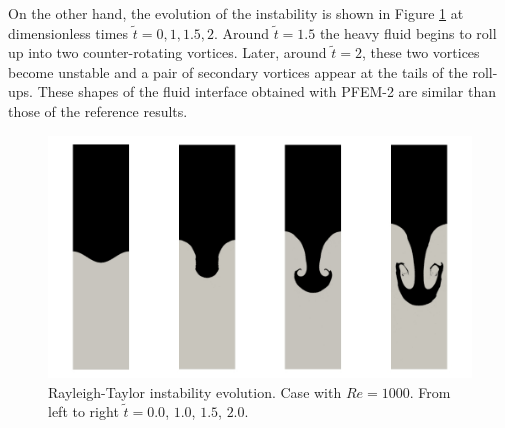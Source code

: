 On the other hand, the evolution of the instability is shown in Figure \ref{fg:rayleigh-screenshots} at dimensionless times $\widetilde{t}=0, 1, 1.5, 2$. Around $\widetilde{t}=1.5$ the heavy fluid begins to roll up into two counter-rotating vortices. Later, around $\widetilde{t} = 2$, these two vortices become unstable and a pair of secondary vortices appear at the tails of the roll-ups. These shapes of the fluid interface obtained with PFEM-2 are similar than those of the reference results.


\begin{figure}[htbp]
  \begin{center}
      \includegraphics[width=\columnwidth]{images/rayleigh_2.jpg}
  \end{center}
  \caption{\label{fg:rayleigh-screenshots} Rayleigh-Taylor instability evolution. Case with $Re=1000$. From left to right $\widetilde{t} =0.0$, $1.0$, $1.5$, $2.0$.}
\end{figure}
\afterpage{\clearpage}

